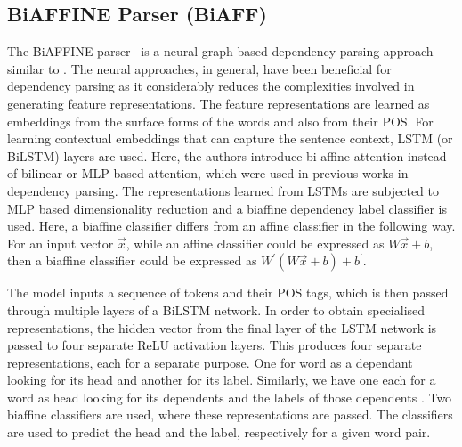 \documentclass[11pt]{article}
\begin{document}
\subsection{BiAFFINE Parser (BiAFF)}
The BiAFFINE parser~\cite{DBLP:conf/iclr/DozatM17} is a neural graph-based dependency parsing approach similar to . The neural approaches, in general, have been beneficial for dependency parsing as it considerably reduces the complexities involved in generating feature representations. The feature representations are learned as embeddings from the surface forms of the words and also from their POS. For learning contextual embeddings that can capture the sentence context, LSTM (or BiLSTM) layers are used. Here, the authors introduce bi-affine attention instead of bilinear or MLP based attention, which were used in previous works in dependency parsing. The representations learned from LSTMs are subjected to MLP based dimensionality reduction and a biaffine dependency label classifier is used. Here, a biaffine classifier differs from an affine classifier in the following way. For an input vector $\vec{x}$, while an affine classifier could be expressed as $W\vec{x}+b$, then a biaffine classifier could be expressed as $W^\prime(W\vec{x}+b) + b^\prime$.

The model inputs a sequence of tokens and their POS tags, which is then passed through multiple layers of a BiLSTM network. In order to obtain specialised representations, the hidden vector from the final layer of the LSTM network is passed to four separate ReLU activation layers. This produces four separate representations, each for a separate purpose. One for word as a dependant looking for its head and another for its label. Similarly, we have one each for a word as head looking for its dependents and the labels of those dependents \cite{DBLP:conf/iclr/DozatM17}. Two biaffine classifiers are used, where these representations are passed. The classifiers are used to predict the head and the label, respectively for a given word pair.

\end{document}
